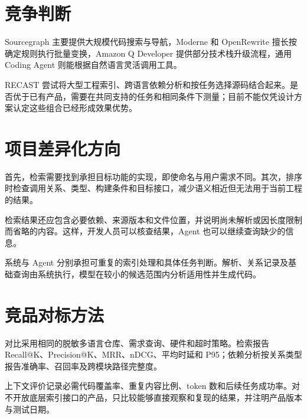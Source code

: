 \section{竞争判断}

Sourcegraph 主要提供大规模代码搜索与导航，Moderne 和 OpenRewrite 擅长按确定规则执行批量变换，Amazon Q Developer 提供部分技术栈升级流程，通用 Coding Agent 则能根据自然语言灵活调用工具。

RECAST 尝试将大型工程索引、跨语言依赖分析和按任务选择源码结合起来。是否优于已有产品，需要在共同支持的任务和相同条件下测量；目前不能仅凭设计方案认定这些组合已经形成效果优势。

\section{项目差异化方向}

首先，检索需要找到承担目标功能的实现，即使命名与用户需求不同。其次，排序时检查调用关系、类型、构建条件和目标接口，减少语义相近但无法用于当前工程的结果。

检索结果还应包含必要依赖、来源版本和文件位置，并说明尚未解析或因长度限制而省略的内容。这样，开发人员可以核查结果，Agent 也可以继续查询缺少的信息。

系统与 Agent 分别承担可重复的索引处理和具体任务判断。解析、关系记录及基础查询由系统执行，模型在较小的候选范围内分析适用性并生成代码。

\section{竞品对标方法}

对比采用相同的脱敏多语言仓库、需求查询、硬件和超时策略。检索报告 Recall@K、Precision@K、MRR、nDCG、平均时延和 P95；依赖分析按关系类型报告准确率、召回率及跨模块路径完整度。

上下文评价记录必需代码覆盖率、重复内容比例、token 数和后续任务成功率。对不开放底层索引接口的产品，只比较能够直接观察和复现的结果，并注明产品版本与测试日期。
